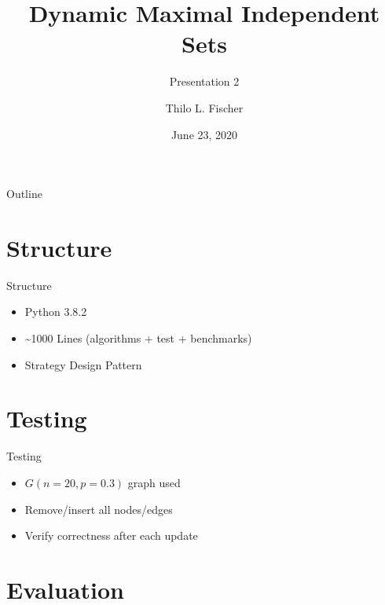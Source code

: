 \documentclass{beamer}
\title{Dynamic Maximal Independent Sets}
\subtitle{Presentation 2}
\author{Thilo L. Fischer}
\date{June 23, 2020}
\begin{document}
\begin{frame}
  \titlepage
\end{frame}

\begin{frame}{Outline}
  \tableofcontents
\end{frame}

\section{Structure}
\begin{frame}{Structure}

  \begin{itemize}
    \item Python 3.8.2
    \item \textasciitilde 1000 Lines (algorithms + test + benchmarks)

    \item Strategy Design Pattern
  \end{itemize}

  \pause

  \begin{center}
  \end{center}
\end{frame}

\section{Testing}
\begin{frame}{Testing}
  \begin{itemize}
    \item $G(n=20, p=0.3)$ graph used
    \item Remove/insert all nodes/edges
    \item Verify correctness after each update
  \end{itemize}
\end{frame}

\section{Evaluation}
\end{document}
